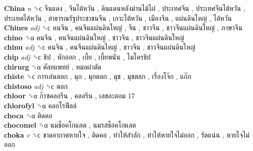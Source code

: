 \textbf{China} \emph{n}  ␝ϲ   จีนแดง ,  จีนไต้หวัน ,  ดินแดนหลังม่านไม้ไผ่ ,  ประเทศจีน ,  ประเทศจีนไต้หวัน ,  ประเทศไต้หวัน ,  สาธารณรัฐประชาชนจีน ,  เกาะไต้หวัน ,  เมืองจีน ,  แผ่นดินใหญ่ ,  ไต้หวัน   \\
\textbf{Chines} \emph{adj}  ␝ϲ   คนจีน ,  คนจีนแผ่นดินใหญ่ ,  จีน ,  ชาวจีน ,  ชาวจีนแผ่นดินใหญ่ ,  ภาษาจีน   \\
\textbf{chino} ␝α   คนจีน ,  คนจีนแผ่นดินใหญ่ ,  ชาวจีน ,  ชาวจีนแผ่นดินใหญ่   \\
\textbf{chinu} \emph{adj}  ␝ϲ   คนจีน ,  คนจีนแผ่นดินใหญ่ ,  ชาวจีน ,  ชาวจีนแผ่นดินใหญ่   \\
\textbf{chip} \emph{adj}  ␝ϲ   ชิป ,  หักออก ,  เบี้ย ,  เบี้ยพนัน ,  ไมโครชิป   \\
\textbf{chirurg} ␝α   ศัลยแพทย์ ,  หมอผ่าตัด   \\
\textbf{chiste} ␝ϲ   การเล่นตลก ,  มุก ,  มุกตลก ,  มุข ,  มุขตลก ,  เรื่องโจ๊ก ,  แก๊ก   \\
\textbf{chistoso} \emph{adj}  ␝ϲ   ตลก   \\
\textbf{chloor} ␝α   ก๊าซคลอรีน ,  คลอรีน ,  เลขอะตอม 17   \\
\textbf{chlorofyl} ␝α   คลอโรฟีลล์   \\
\textbf{choca} ␝α   ติดคอ   \\
\textbf{chocomel} ␝α   นมช็อคโกแลต ,  นมรสช็อคโกแลต   \\
\textbf{choka} \emph{v}  ␝ϲ   ขาดอากาศหายใจ ,  ติดคอ ,  ทำให้สำลัก ,  ทำให้หายใจไม่ออก ,  รัดแน่น ,  หายใจไม่ออก   \\
